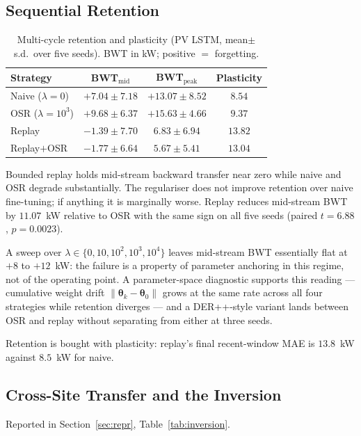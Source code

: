 \documentclass[journal]{IEEEtran}
\newcommand{\params}{\boldsymbol{\theta}}
\newcommand{\ewclambda}{\lambda}
\begin{document}
\subsection{Sequential Retention}
\label{sec:results_seq}

\begin{table}[t]
\centering
\caption{Multi-cycle retention and plasticity (PV LSTM, mean$\pm$s.d.\ over five
seeds). BWT in kW; positive $=$ forgetting.}
\label{tab:multicycle}
\begin{tabular}{@{}lccc@{}}
\toprule
\textbf{Strategy} & \textbf{BWT}$_{\mathrm{mid}}$ & \textbf{BWT}$_{\mathrm{peak}}$
& \textbf{Plasticity} \\
\midrule
Naive ($\ewclambda{=}0$) & $+7.04\pm7.18$ & $+13.07\pm8.52$ & $8.54$ \\
OSR ($\ewclambda{=}10^3$) & $+9.68\pm6.37$ & $+15.63\pm4.66$ & $9.37$ \\
Replay & $\mathbf{-1.39\pm7.70}$ & $\mathbf{6.83\pm6.94}$ & $13.82$ \\
Replay${+}$OSR & $\mathbf{-1.77\pm6.64}$ & $\mathbf{5.67\pm5.41}$ & $13.04$ \\
\bottomrule
\end{tabular}
\end{table}

Bounded replay holds mid-stream backward transfer near zero while naive and OSR
degrade substantially. The regulariser does not improve retention over naive
fine-tuning; if anything it is marginally worse. Replay reduces mid-stream BWT
by $11.07$~kW relative to OSR with the same sign on all five seeds (paired
$t{=}6.88$, $p{=}0.0023$).

A sweep over $\ewclambda \in \{0,10,10^2,10^3,10^4\}$ leaves mid-stream BWT
essentially flat at $+8$ to $+12$~kW: the failure is a property of parameter
anchoring in this regime, not of the operating point. A parameter-space
diagnostic supports this reading --- cumulative weight drift
$\lVert\params_k-\params_0\rVert$ grows at the same rate across all four
strategies while retention diverges --- and a DER++-style variant lands between
OSR and replay without separating from either at three seeds.

Retention is bought with plasticity: replay's final recent-window MAE is
$13.8$~kW against $8.5$~kW for naive.

\subsection{Cross-Site Transfer and the Inversion}
Reported in Section~\ref{sec:repr}, Table~\ref{tab:inversion}.
\end{document}
